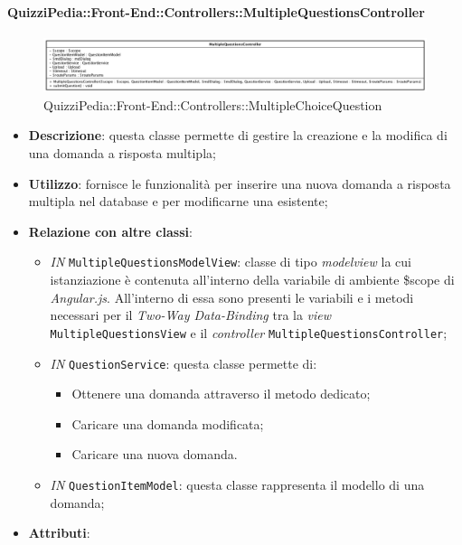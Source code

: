 \paragraph{QuizziPedia::Front-End::Controllers::MultipleQuestionsController}
\begin{figure} [ht]
	\centering
	\includegraphics[scale=0.40]{UML/Classi/Front-End/QuizziPedia_Front-end_Controller_MultipleQuestionsController.png}
	\caption{QuizziPedia::Front-End::Controllers::MultipleChoiceQuestion}
\end{figure} \FloatBarrier
\begin{itemize}
	\item \textbf{Descrizione}: questa classe permette di gestire la creazione e la modifica di una domanda a risposta multipla;
	\item \textbf{Utilizzo}: fornisce le funzionalità per inserire una nuova domanda a risposta multipla nel database e per modificarne una esistente;
	\item \textbf{Relazione con altre classi}:
	\begin{itemize}
		\item \textit{IN} \texttt{MultipleQuestionsModelView}: classe di tipo \textit{modelview} la cui istanziazione è contenuta all'interno della variabile di ambiente \$scope di \textit{Angular.js}. All'interno di essa sono presenti le variabili e i metodi necessari per il \textit{Two-Way Data-Binding} tra la \textit{view} \texttt{MultipleQuestionsView} e il \textit{controller} \texttt{MultipleQuestionsController};
		\item \textit{IN} \texttt{QuestionService}: questa classe permette di:
		\begin{itemize}
			\item Ottenere una domanda attraverso il metodo dedicato;
			\item Caricare una domanda modificata;
			\item Caricare una nuova domanda.
		\end{itemize}
		\item \textit{IN} \texttt{QuestionItemModel}: questa classe rappresenta il modello di una domanda;
	\end{itemize}
	\item \textbf{Attributi}:
	\begin{itemize}

\end{itemize}
\end{itemize}
